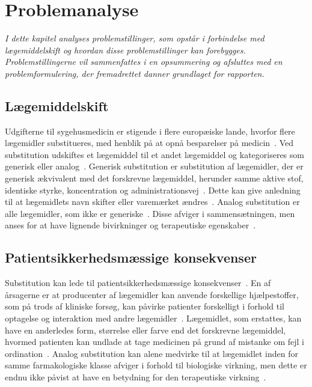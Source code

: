 \chapter{Problemanalyse}
\textit{I dette kapitel analyses problemstillinger, som opstår i forbindelse med lægemiddelskift og hvordan disse problemstillinger kan forebygges. Problemstillingerne vil sammenfattes i en opsummering og afsluttes med en problemformulering, der fremadrettet danner grundlaget for rapporten.}

\section{Lægemiddelskift}
Udgifterne til sygehusmedicin er stigende i flere europæiske lande, hvorfor flere lægemidler substitueres, med henblik på at opnå besparelser på medicin~\citep{Ess2003,Johnston2011}. Ved substitution udskiftes et lægemiddel til et andet lægemiddel og kategoriseres som generisk eller analog~\citep{DanskSelskabforPatientsikkerhed2009, Kairi2017}. Generisk substitution er substitution af lægemidler, der er  generisk ækvivalent med det forskrevne lægemiddel, herunder samme aktive stof, identiske styrke, koncentration og administrationsvej~\citep{DanskSelskabforPatientsikkerhed2009, Kairi2017}. Dette kan give anledning til at lægemidlets navn skifter eller varemærket ændres~\citep{Kairi2017}. Analog substitution er alle lægemidler, som ikke er generiske~\citep{Kairi2017}. Disse afviger i sammensætningen, men anses for at have lignende bivirkninger og terapeutiske egenskaber~\citep{DanskSelskabforPatientsikkerhed2009, Kairi2017}.


\section{Patientsikkerhedsmæssige konsekvenser} \label{sec:ProblemLaeg} %
Substitution kan lede til patientsikkerhedsmæssige konsekvenser~\citep{DanskSelskabforPatientsikkerhed2009}. En af årsagerne er at producenter af lægemidler kan anvende forskellige hjælpestoffer, som på trods af kliniske forsøg, kan påvirke patienter forskelligt i forhold til optagelse og interaktion med andre lægemidler~\citep{Kairi2017}. Lægemidlet, som erstattes, kan have en anderledes form, størrelse eller farve end det forskrevne lægemiddel, hvormed patienten kan undlade at tage medicinen på grund af mistanke om fejl i ordination~\citep{Kairi2017}. Analog substitution kan alene medvirke til at lægemidlet inden for samme farmakologiske klasse afviger i forhold til biologiske virkning, men dette er endnu ikke påvist at have en betydning for den terapeutiske virkning~\citep{Kairi2017}. 

